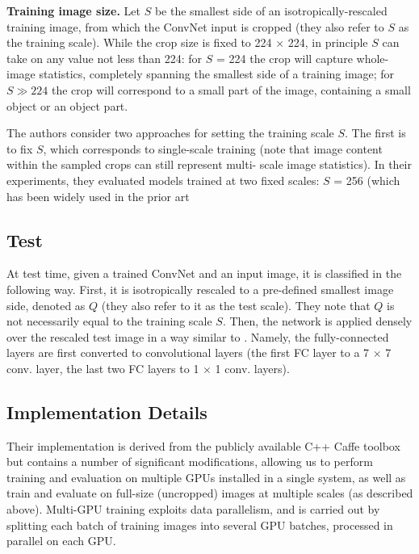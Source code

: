 \documentclass[10pt,twocolumn,letterpaper]{article}
\begin{document}
\par
\textbf{Training image size.} Let $S$ be the smallest side of an isotropically-rescaled training image, from
which the ConvNet input is cropped (they also refer to $S$ as the training scale). While the crop size
is fixed to 224 $\times$ 224, in principle $S$ can take on any value not less than 224: for $S$ = 224 the crop
will capture whole-image statistics, completely spanning the smallest side of a training image; for
$S \gg224 $ the crop will correspond to a small part of the image, containing a small object or an object part. 
\par
The authors consider two approaches for setting the training scale $S$. The first is to fix $S$, which corresponds
to single-scale training (note that image content within the sampled crops can still represent multi-
scale image statistics). In their experiments, they evaluated models trained at two fixed scales: $S$ =
256 (which has been widely used in the prior art \cite{zeiler2014visualizing}
\subsection{Test}
At test time, given a trained ConvNet and an input image, it is classified in the following way. First,
it is isotropically rescaled to a pre-defined smallest image side, denoted as $Q$ (they also refer to it
as the test scale). They note that $Q$ is not necessarily equal to the training scale $S$. Then, the network
is applied densely over the rescaled test image in a way similar to \cite{sermanet2013overfeat}. Namely,
the fully-connected layers are first converted to convolutional layers (the first FC layer to a 7 $\times$ 7
conv. layer, the last two FC layers to 1 $\times$ 1 conv. layers).
\subsection{Implementation Details}
Their implementation is derived from the publicly available C++ Caffe toolbox but contains a number of significant modifications, allowing us to perform
training and evaluation on multiple GPUs installed in a single system, as well as train and evaluate on
full-size (uncropped) images at multiple scales (as described above). Multi-GPU training exploits
data parallelism, and is carried out by splitting each batch of training images into several GPU
batches, processed in parallel on each GPU.


\end{document}
